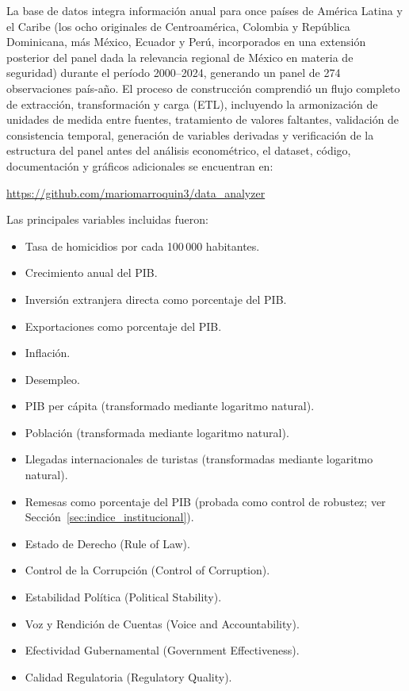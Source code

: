 \documentclass[11pt,a4paper]{article}
\begin{document}
La base de datos integra información anual para once países de América Latina y el Caribe (los ocho originales de Centroamérica, Colombia y República Dominicana, más México, Ecuador y Perú, incorporados en una extensión posterior del panel dada la relevancia regional de México en materia de seguridad) durante el período 2000--2024, generando un panel de 274 observaciones país-año. El proceso de construcción comprendió un flujo completo de extracción, transformación y carga (ETL), incluyendo la armonización de unidades de medida entre fuentes, tratamiento de valores faltantes, validación de consistencia temporal, generación de variables derivadas y verificación de la estructura del panel antes del análisis econométrico, el dataset, código, documentación y gráficos adicionales se encuentran en:
\begin{center}
\url{https://github.com/mariomarroquin3/data_analyzer}
\end{center}

Las principales variables incluidas fueron:

\begin{itemize}
\item Tasa de homicidios por cada 100\,000 habitantes.
\item Crecimiento anual del PIB.
\item Inversión extranjera directa como porcentaje del PIB.
\item Exportaciones como porcentaje del PIB.
\item Inflación.
\item Desempleo.
\item PIB per cápita (transformado mediante logaritmo natural).
\item Población (transformada mediante logaritmo natural).
\item Llegadas internacionales de turistas (transformadas mediante logaritmo natural).
\item Remesas como porcentaje del PIB (probada como control de robustez; ver Sección~\ref{sec:indice_institucional}).
\item Estado de Derecho (Rule of Law).
\item Control de la Corrupción (Control of Corruption).
\item Estabilidad Política (Political Stability).
\item Voz y Rendición de Cuentas (Voice and Accountability).
\item Efectividad Gubernamental (Government Effectiveness).
\item Calidad Regulatoria (Regulatory Quality).
\end{itemize}
\end{document}

